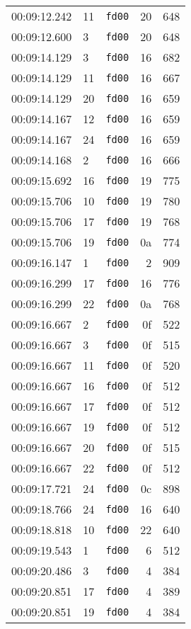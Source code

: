 \documentclass{article}
\begin{document}
\begin{longtable}{lllrr}
00:09:12.242 & 11 & \texttt{fd00} & 20 & 648 \\
00:09:12.600 & 3 & \texttt{fd00} & 20 & 648 \\
00:09:14.129 & 3 & \texttt{fd00} & 16 & 682 \\
00:09:14.129 & 11 & \texttt{fd00} & 16 & 667 \\
00:09:14.129 & 20 & \texttt{fd00} & 16 & 659 \\
00:09:14.167 & 12 & \texttt{fd00} & 16 & 659 \\
00:09:14.167 & 24 & \texttt{fd00} & 16 & 659 \\
00:09:14.168 & 2 & \texttt{fd00} & 16 & 666 \\
00:09:15.692 & 16 & \texttt{fd00} & 19 & 775 \\
00:09:15.706 & 10 & \texttt{fd00} & 19 & 780 \\
00:09:15.706 & 17 & \texttt{fd00} & 19 & 768 \\
00:09:15.706 & 19 & \texttt{fd00} & 0a & 774 \\
00:09:16.147 & 1 & \texttt{fd00} & 2 & 909 \\
00:09:16.299 & 17 & \texttt{fd00} & 16 & 776 \\
00:09:16.299 & 22 & \texttt{fd00} & 0a & 768 \\
00:09:16.667 & 2 & \texttt{fd00} & 0f & 522 \\
00:09:16.667 & 3 & \texttt{fd00} & 0f & 515 \\
00:09:16.667 & 11 & \texttt{fd00} & 0f & 520 \\
00:09:16.667 & 16 & \texttt{fd00} & 0f & 512 \\
00:09:16.667 & 17 & \texttt{fd00} & 0f & 512 \\
00:09:16.667 & 19 & \texttt{fd00} & 0f & 512 \\
00:09:16.667 & 20 & \texttt{fd00} & 0f & 515 \\
00:09:16.667 & 22 & \texttt{fd00} & 0f & 512 \\
00:09:17.721 & 24 & \texttt{fd00} & 0c & 898 \\
00:09:18.766 & 24 & \texttt{fd00} & 16 & 640 \\
00:09:18.818 & 10 & \texttt{fd00} & 22 & 640 \\
00:09:19.543 & 1 & \texttt{fd00} & 6 & 512 \\
00:09:20.486 & 3 & \texttt{fd00} & 4 & 384 \\
00:09:20.851 & 17 & \texttt{fd00} & 4 & 389 \\
00:09:20.851 & 19 & \texttt{fd00} & 4 & 384 \\

\end{longtable}
\end{document}

